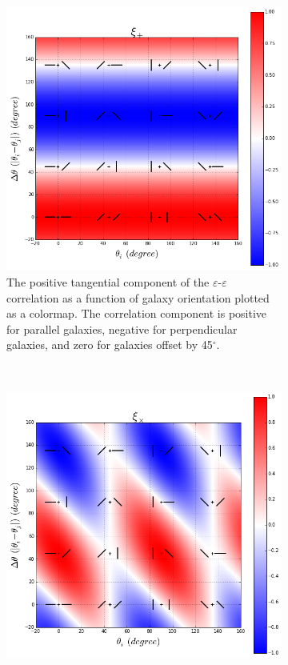\documentclass[%
 reprint,
 amsmath,amssymb,
 aps,nofootinbib
]{revtex4-1}
\begin{document}
\begin{figure}[!b]
    \centering
    \begin{subfigure}{0.425\textwidth}
        \includegraphics[width=\textwidth]{figs-swe/xip_colormap.png}
        \captionsetup{justification=raggedright,singlelinecheck=false}
        \caption{The positive tangential component of the $\varepsilon$-$\varepsilon$ correlation as a function of galaxy orientation plotted as a colormap. The correlation component is positive for parallel galaxies, negative for perpendicular galaxies, and zero for galaxies offset by 45$^\circ$.}
        \label{xip_colormap}
    \end{subfigure}
    ~
    \begin{subfigure}{0.425\textwidth}
        \includegraphics[width=\textwidth]{figs-swe/xix_colormap.png}

\end{subfigure}
\end{figure}
\end{document}
